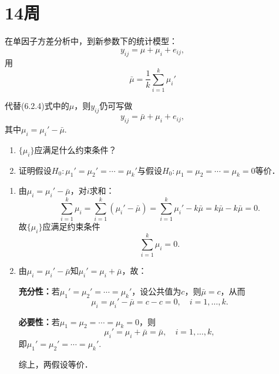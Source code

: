 \section{14周}
\begin{homework}[1]
在单因子方差分析中，到新参数下的统计模型：
\begin{equation}
    y_{ij} = \mu + \mu_i + e_{ij}, \tag{6.2.4}
\end{equation}
用
\[
\bar{\mu} = \frac{1}{k}\sum_{i=1}^{k}\mu_i'
\]

代替(6.2.4)式中的$\mu$，则$y_{ij}$仍可写做
\[
y_{ij} = \bar{\mu} + \mu_i + e_{ij},
\]
其中$\mu_i = \mu_i' - \bar{\mu}$.
\begin{enumerate}
    \item $\{\mu_i\}$应满足什么约束条件？
    \item 证明假设$H_0: \mu_1' = \mu_2' = \cdots = \mu_k'$与假设$H_0: \mu_1 = \mu_2 = \cdots = \mu_k = 0$等价．
\end{enumerate}
\end{homework}
\begin{solution}
\begin{enumerate}
    \item 由$\mu_i = \mu_i' - \bar{\mu}$，对$i$求和：
    \[
    \sum_{i=1}^{k}\mu_i = \sum_{i=1}^{k}(\mu_i' - \bar{\mu}) = \sum_{i=1}^{k}\mu_i' - k\bar{\mu} = k\bar{\mu} - k\bar{\mu} = 0.
    \]
    故$\{\mu_i\}$应满足约束条件
    \[
    \sum_{i=1}^{k}\mu_i = 0.
    \]

    \item 由$\mu_i = \mu_i' - \bar{\mu}$知$\mu_i' = \mu_i + \bar{\mu}$，故：

    \textbf{充分性：}若$\mu_1' = \mu_2' = \cdots = \mu_k'$，设公共值为$c$，则$\bar{\mu} = c$，从而
    \[
    \mu_i = \mu_i' - \bar{\mu} = c - c = 0, \quad i = 1,\ldots,k.
    \]

    \textbf{必要性：}若$\mu_1 = \mu_2 = \cdots = \mu_k = 0$，则
    \[
    \mu_i' = \mu_i + \bar{\mu} = \bar{\mu}, \quad i = 1,\ldots,k,
    \]
    即$\mu_1' = \mu_2' = \cdots = \mu_k'$.

    综上，两假设等价．
\end{enumerate}
\end{solution}
